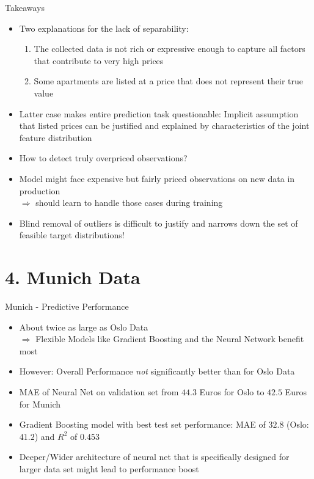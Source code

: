 \documentclass[ngerman,inputenc]{beamer}
\begin{document}
\begin{frame}{Takeaways}
  \begin{itemize}
    \item Two explanations for the lack of separability:
          \begin{enumerate}
            \item The collected data is not rich or expressive enough to capture all factors that contribute to very high prices
            \item Some apartments are listed at a price that does not represent their true value
          \end{enumerate}
    \item Latter case makes entire prediction task questionable: Implicit assumption that listed prices can be justified and explained by characteristics of the joint feature distribution
    \item How to detect truly overpriced observations?
    \item Model might face expensive but fairly priced observations on new data in production \\
          $\Rightarrow$ should learn to handle those cases during training
    \item Blind removal of outliers is difficult to justify and narrows down the set of feasible target distributions!
  \end{itemize}
\end{frame}


\section{4. Munich Data}

\begin{frame}{Munich - Predictive Performance}
  \begin{itemize}
    \item About twice as large as Oslo Data \\
          $\Rightarrow$ Flexible Models like Gradient Boosting and the Neural Network benefit most
    \item However: Overall Performance \emph{not} significantly better than for Oslo Data
    \item MAE of Neural Net on validation set from $44.3$ Euros for Oslo to $42.5$ Euros for Munich
    \item Gradient Boosting model with best test set performance: MAE of $32.8$ (Oslo: $41.2$) and $R^2$ of $0.453$
    \item Deeper/Wider architecture of neural net that is specifically designed for larger data set might lead to performance boost
  \end{itemize}
\end{frame}
\end{document}
